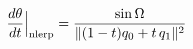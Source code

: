 \documentclass[preview]{standalone}
\begin{document}
\begin{align*}
\special{dvisvgm:raw <g id='unique000'>}\frac{d\theta}{dt}\Big|_{\mathrm{nlerp}}=\frac{\sin\Omega}{\lVert (1-t)q_0+t\,q_1\rVert^{2}}\special{dvisvgm:raw </g>}
\end{align*}
\end{document}
